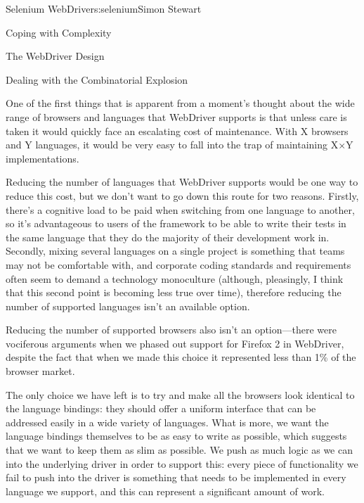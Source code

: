 \begin{aosachapter}{Selenium WebDriver}{s:selenium}{Simon Stewart}
\begin{aosasect1}{Coping with Complexity}
\begin{aosasect2}{The WebDriver Design}


\end{aosasect2}

\begin{aosasect2}{Dealing with the Combinatorial Explosion}

One of the first things that is apparent from a moment's thought about
the wide range of browsers and languages that WebDriver supports is
that unless care is taken it would quickly face an escalating cost of
maintenance. With X browsers and Y languages, it would be very easy to
fall into the trap of maintaining X${\times}$Y implementations.

Reducing the number of languages that WebDriver supports would be one
way to reduce this cost, but we don't want to go down this route for
two reasons. Firstly, there's a cognitive load to be paid when
switching from one language to another, so it's advantageous to users
of the framework to be able to write their tests in the same language
that they do the majority of their development work in. Secondly,
mixing several languages on a single project is something that teams
may not be comfortable with, and corporate coding standards and
requirements often seem to demand a technology monoculture (although,
pleasingly, I think that this second point is becoming less true over
time), therefore reducing the number of supported languages isn't an
available option.

Reducing the number of supported browsers also isn't an option---there
were vociferous arguments when we phased out support for Firefox 2 in
WebDriver, despite the fact that when we made this choice it
represented less than 1\% of the browser market.

The only choice we have left is to try and make all the browsers look
identical to the language bindings: they should offer a uniform
interface that can be addressed easily in a wide variety of languages.
What is more, we want the language bindings themselves to be as easy
to write as possible, which suggests that we want to keep them as slim
as possible. We push as much logic as we can into the underlying
driver in order to support this: every piece of functionality we fail
to push into the driver is something that needs to be implemented in
every language we support, and this can represent a significant amount
of work.


\end{aosasect2}
\end{aosasect1}
\end{aosachapter}
